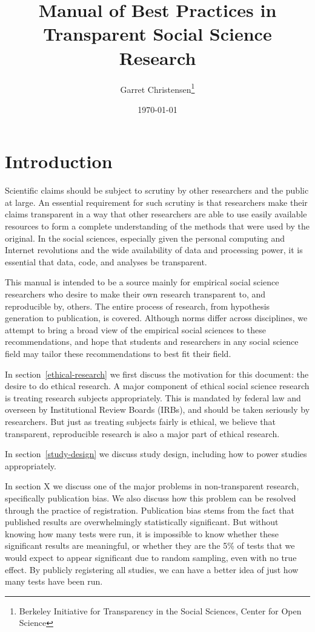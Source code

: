 \documentclass[12pt] {article}
\begin{document}
\title{Manual of Best Practices in Transparent Social Science Research}

\author{Garret Christensen\thanks{Berkeley Initiative for Transparency in the Social Sciences, Center for Open Science}}
\date{\today}
\maketitle
\newpage
\tableofcontents

\newpage
\section{Introduction}\label{introduction}

Scientific claims should be subject to scrutiny by other researchers and
the public at large. An essential requirement for such scrutiny is that
researchers make their claims transparent in a way that other
researchers are able to use easily available resources to form a
complete understanding of the methods that were used by the original. In
the social sciences, especially given the personal computing and
Internet revolutions and the wide availability of data and processing
power, it is essential that data, code, and analyses be transparent.

This manual is intended to be a source mainly for empirical social
science researchers who desire to make their own research transparent
to, and reproducible by, others. The entire process of research, from
hypothesis generation to publication, is covered. Although norms differ
across disciplines, we attempt to bring a broad view of the empirical
social sciences to these recommendations, and hope that students and
researchers in any social science field may tailor these recommendations
to best fit their field.

In section~\ref{ethical-research} we first discuss the motivation for this document: the
desire to do ethical research. A major component of ethical social
science research is treating research subjects appropriately. This is
mandated by federal law and overseen by Institutional Review Boards
(IRBs), and should be taken seriously by researchers. But just as
treating subjects fairly is ethical, we believe that transparent,
reproducible research is also a major part of ethical research.

In section~\ref{study-design} we discuss study design, including how to power studies
appropriately.

In section X we discuss one of the major problems in non-transparent
research, specifically publication bias. We also discuss how this
problem can be resolved through the practice of registration.
Publication bias stems from the fact that published results are
overwhelmingly statistically significant. But without knowing how many
tests were run, it is impossible to know whether these significant
results are meaningful, or whether they are the 5\% of tests that we
would expect to appear significant due to random sampling, even with no
true effect. By publicly registering all studies, we can have a better
idea of just how many tests have been run.
\end{document}
